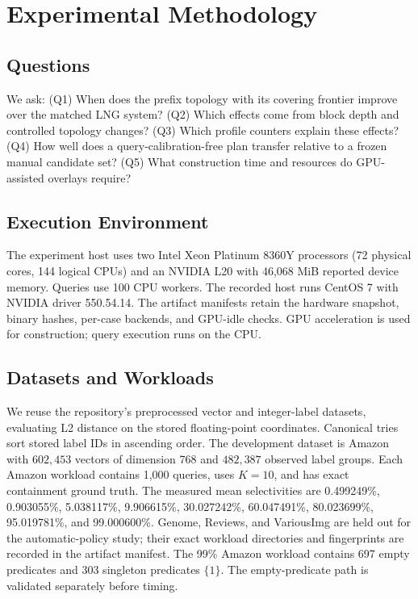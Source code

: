 \section{Experimental Methodology}
\label{sec:methodology}
\authoritativeDatasetTable
\subsection{Questions}
We ask: (Q1) When does the prefix topology with its covering frontier improve
over the matched LNG system? (Q2) Which effects come from block depth and
controlled topology changes? (Q3) Which profile counters explain these effects?
(Q4) How well does a query-calibration-free plan transfer relative to a frozen
manual candidate set? (Q5) What construction time and resources do
GPU-assisted overlays require?

\subsection{Execution Environment}
The experiment host uses two Intel Xeon Platinum 8360Y processors (72 physical
cores, 144 logical CPUs) and an NVIDIA L20 with 46,068 MiB reported device
memory. Queries use 100 CPU workers. The recorded host runs CentOS 7
with NVIDIA driver 550.54.14. The artifact manifests retain the hardware
snapshot, binary hashes, per-case backends, and GPU-idle checks. GPU acceleration is used for construction; query execution runs on the CPU.

\subsection{Datasets and Workloads}
We reuse the repository's preprocessed vector and integer-label datasets,
evaluating L2 distance on the stored floating-point coordinates. Canonical
tries sort stored label IDs in ascending order. The development dataset is Amazon with $602{,}453$ vectors of dimension 768 and
$482{,}387$ observed label groups.  Each Amazon workload contains 1,000 queries, uses
$K=10$, and has exact containment ground truth.  The measured mean
selectivities are 0.499249\%, 0.903055\%, 5.038117\%, 9.906615\%, 30.027242\%,
60.047491\%, 80.023699\%, 95.019781\%, and 99.000600\%.  Genome, Reviews, and
VariousImg are held out for the automatic-policy study; their exact workload
directories and fingerprints are recorded in the artifact manifest.
The 99\% Amazon workload contains 697 empty predicates and 303 singleton
predicates $\{1\}$.  The empty-predicate path is validated separately before timing.

